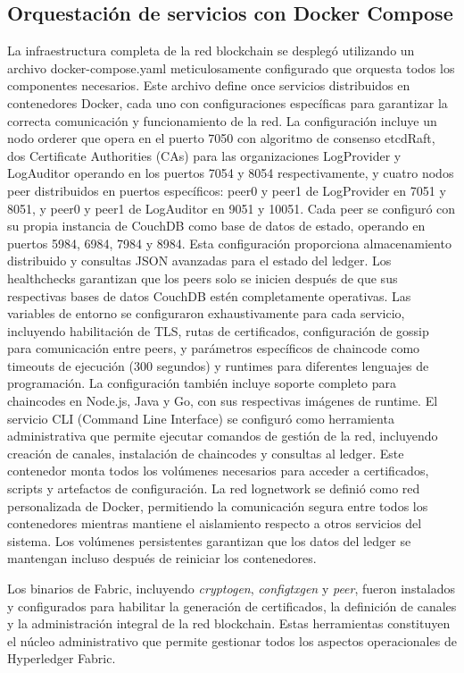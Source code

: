 \subsection{Orquestación de servicios con Docker Compose}
La infraestructura completa de la red blockchain se desplegó utilizando un archivo docker-compose.yaml meticulosamente configurado que orquesta todos los componentes necesarios. Este archivo define once servicios distribuidos en contenedores Docker, cada uno con configuraciones específicas para garantizar la correcta comunicación y funcionamiento de la red.
La configuración incluye un nodo orderer que opera en el puerto 7050 con algoritmo de consenso etcdRaft, dos Certificate Authorities (CAs) para las organizaciones LogProvider y LogAuditor operando en los puertos 7054 y 8054 respectivamente, y cuatro nodos peer distribuidos en puertos específicos: peer0 y peer1 de LogProvider en 7051 y 8051, y peer0 y peer1 de LogAuditor en 9051 y 10051.
Cada peer se configuró con su propia instancia de CouchDB como base de datos de estado, operando en puertos 5984, 6984, 7984 y 8984. Esta configuración proporciona almacenamiento distribuido y consultas JSON avanzadas para el estado del ledger. Los healthchecks garantizan que los peers solo se inicien después de que sus respectivas bases de datos CouchDB estén completamente operativas.
Las variables de entorno se configuraron exhaustivamente para cada servicio, incluyendo habilitación de TLS, rutas de certificados, configuración de gossip para comunicación entre peers, y parámetros específicos de chaincode como timeouts de ejecución (300 segundos) y runtimes para diferentes lenguajes de programación. La configuración también incluye soporte completo para chaincodes en Node.js, Java y Go, con sus respectivas imágenes de runtime.
El servicio CLI (Command Line Interface) se configuró como herramienta administrativa que permite ejecutar comandos de gestión de la red, incluyendo creación de canales, instalación de chaincodes y consultas al ledger. Este contenedor monta todos los volúmenes necesarios para acceder a certificados, scripts y artefactos de configuración.
La red lognetwork se definió como red personalizada de Docker, permitiendo la comunicación segura entre todos los contenedores mientras mantiene el aislamiento respecto a otros servicios del sistema. Los volúmenes persistentes garantizan que los datos del ledger se mantengan incluso después de reiniciar los contenedores.

Los binarios de Fabric, incluyendo \textit{cryptogen}, \textit{configtxgen} y \textit{peer}, fueron instalados y configurados para habilitar la generación de certificados, la definición de canales y la administración integral de la red blockchain. Estas herramientas constituyen el núcleo administrativo que permite gestionar todos los aspectos operacionales de Hyperledger Fabric.

